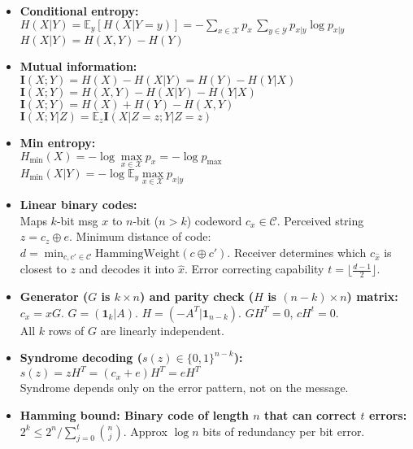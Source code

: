 \documentclass[twocolumn,9pt]{extarticle}
\begin{document}
\begin{itemize}
	\item \textbf{Conditional entropy: } \\
	$H(X|Y) = \mathbb{E}_y[H(X|Y = y)] = - \sum_{x \in \mathcal{X}} p_x\, \sum_{y \in \mathcal{Y}} p_{x|y} \log p_{x|y}$ \\
	$H(X|Y) = H(X,Y) - H(Y)$
	
	\item \textbf{Mutual information: } \\
	$\mathbf{I}(X;Y) = H(X) - H(X|Y) = H(Y) - H(Y|X)$\\
	$\mathbf{I}(X;Y) = H(X,Y) - H(X|Y) - H(Y|X)$\\
	$\mathbf{I}(X;Y) = H(X) + H(Y) - H(X,Y)$\\
	$\mathbf{I}(X;Y|Z) = \mathbb{E}_z \mathbf{I}(X|Z=z ; Y|Z = z)$

	\item \textbf{Min entropy: } \\
	$H_{\text{min}}(X) = -\log \max\limits_{x \in \mathcal{X}} p_x = -\log p_{\text{max}}$\\
	$H_{\text{min}}(X|Y) = -\log \mathbb{E}_y \max\limits_{x \in \mathcal{X}} p_{x|y}$

	\item \textbf{Linear binary codes: } \\
	Maps $k$-bit msg $x$ to $n$-bit ($n > k$) codeword $c_x \in \mathcal{C}$. Perceived string $z = c_z \oplus e$. Minimum distance of code: $d = \min_{c,c'\in\mathcal{C}} \text{HammingWeight}(c \oplus c')$. Receiver determines which $c_{\hat{x}}$ is closest to $z$ and decodes it into $\hat{x}$. Error correcting capability $t = \lfloor\frac{d-1}{2}\rfloor$.

	\item \textbf{Generator ($G$ is $k \times n$) and parity check ($H$ is $(n-k) \times n$) matrix: } \\
	$c_x = xG$. $G = (\mathbf{1}_k|A)$. $H = (-A^T|\mathbf{1}_{n-k})$. $GH^T= 0$, $cH^t=0$.\\
	All $k$ rows of $G$ are linearly independent.

	\item \textbf{Syndrome decoding ($s(z) \in \{0,1\}^{n-k}$):} \\
	$s(z) = zH^T = (c_x + e)H^T = eH^T$\\
	Syndrome depends only on the error pattern, not on the message.

	\item \textbf{Hamming bound: Binary code of length $n$ that can correct $t$ errors: } \\
	$2^k \leq 2^n / \sum_{j=0}^t \binom nj$. Approx $\log n$ bits of redundancy per bit error.


\end{itemize}
\end{document}
